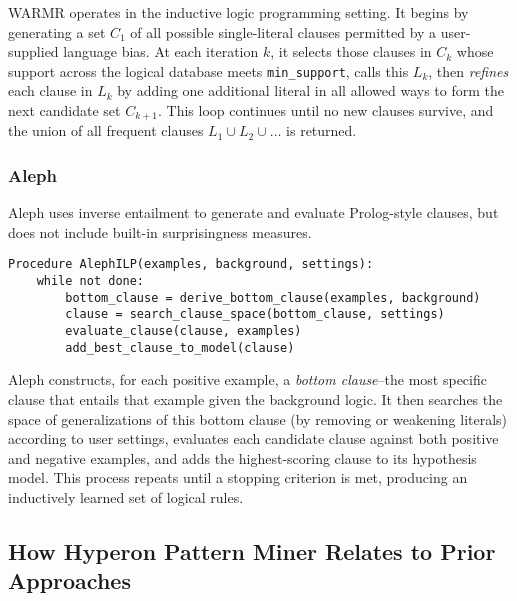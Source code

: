 WARMR operates in the inductive logic programming setting.  It begins by generating a set \(C_1\) of all possible single-literal clauses permitted by a user-supplied language bias.  At each iteration \(k\), it selects those clauses in \(C_k\) whose support across the logical database meets \texttt{min\_support}, calls this \(L_k\), then \emph{refines} each clause in \(L_k\) by adding one additional literal in all allowed ways to form the next candidate set \(C_{k+1}\).  This loop continues until no new clauses survive, and the union of all frequent clauses \(L_1 \cup L_2 \cup \dots\) is returned.

\subsubsection{Aleph}

Aleph \cite{srinivasan2002aleph} uses inverse entailment to generate and evaluate Prolog-style clauses, but does not include built-in surprisingness measures.

\begin{verbatim}
Procedure AlephILP(examples, background, settings):
    while not done:
        bottom_clause = derive_bottom_clause(examples, background)
        clause = search_clause_space(bottom_clause, settings)
        evaluate_clause(clause, examples)
        add_best_clause_to_model(clause)
\end{verbatim}

Aleph constructs, for each positive example, a \emph{bottom clause}--the most specific clause that entails that example given the background logic.  It then searches the space of generalizations of this bottom clause (by removing or weakening literals) according to user settings, evaluates each candidate clause against both positive and negative examples, and adds the highest-scoring clause to its hypothesis model.  This process repeats until a stopping criterion is met, producing an inductively learned set of logical rules.

\subsection{How Hyperon Pattern Miner Relates to Prior Approaches}


